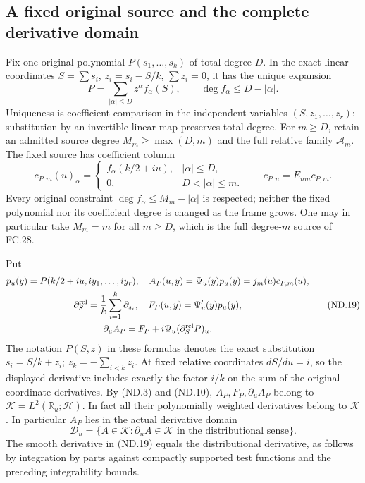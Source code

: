 \subsection{A fixed original source and the complete derivative domain}

Fix one original polynomial \(P(s_1,\ldots,s_k)\) of total degree
\(D\). In the exact linear coordinates
\(S=\sum s_i\), \(z_i=s_i-S/k\), \(\sum z_i=0\), it has
the unique expansion
\[
 P=\sum_{|\alpha|\le D}z^\alpha f_\alpha(S),\qquad
 \deg f_\alpha\le D-|\alpha|.
 \tag{ND.17}
\]
Uniqueness is coefficient comparison in the independent variables
\((S,z_1,\ldots,z_r)\); substitution by an invertible linear
map preserves total degree. For \(m\ge D\), retain an admitted
source degree \(M_m\ge\max(D,m)\) and the full relative family
\(\mathcal A_m\). The fixed source has coefficient column
\[
 c_{P,m}(u)_\alpha=
 \begin{cases}f_\alpha(k/2+iu),&|\alpha|\le D,\\
 0,&D<|\alpha|\le m.
 \end{cases}
 \qquad c_{P,n}=E_{nm}c_{P,m}.
 \tag{ND.18}
\]
Every original constraint \(\deg f_\alpha\le M_m-|\alpha|\)
is respected; neither the fixed polynomial nor its coefficient degree
is changed as the frame grows. One may in particular take \(M_m=m\)
for all \(m\ge D\), which is the full degree-\(m\) source of FC.28.

Put
\[
 \begin{gathered}
 p_u(y)=P(k/2+iu,iy_1,\ldots,iy_r),\quad
 A_P(u,y)=\Psi_u(y)p_u(y)=j_m(u)c_{P,m}(u),\\
 \partial_S^{\rm rel}=\frac1k\sum_{i=1}^k\partial_{s_i},\quad
 F_P(u,y)=\Psi'_u(y)p_u(y),\\
 \partial_u A_P=F_P+i\Psi_u(\partial_S^{\rm rel}P)_u.
 \end{gathered}
 \tag{ND.19}
\]
The notation \(P(S,z)\) in these formulas denotes the exact
substitution \(s_i=S/k+z_i\); \(z_k=-\sum_{i<k}z_i\).
At fixed relative coordinates \(dS/du=i\), so the displayed
derivative includes exactly the factor \(i/k\) on the sum of
the original coordinate derivatives. By (ND.3) and (ND.10),
\(A_P,F_P,\partial_uA_P\) belong to
\(\mathscr K=L^2(\mathbb R_u;\mathscr H)\).
In fact all their polynomially weighted derivatives belong to
\(\mathscr K\). In particular \(A_P\) lies in the actual
derivative domain
\[
 \mathcal D_u=\{A\in\mathscr K:\partial_uA\in\mathscr K
                         \text{ in the distributional sense}\}.
 \tag{ND.20}
\]
The smooth derivative in (ND.19) equals the distributional derivative,
as follows by integration by parts against compactly supported test
functions and the preceding integrability bounds.

